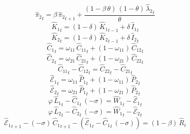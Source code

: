 \begin{dmath}
{{\hat{\pi}_{2}}}_{t}={{\beta}}\, {{\hat{\pi}_{2}}}_{t+1}+\frac{\left(1-{{\beta}}\, {{\theta}}\right)\, \left(1-{{\theta}}\right)\, {{\hat{\lambda}_{2}}}_{t}}{{{\theta}}}
\end{dmath}
\begin{dmath}
{{\hat{K}_{1}}}_{t}=\left(1-{{\delta}}\right)\, {{\hat{K}_{1}}}_{t-1}+{{\delta}}\, {{\hat{I}_{1}}}_{t}
\end{dmath}
\begin{dmath}
{{\hat{K}_{2}}}_{t}=\left(1-{{\delta}}\right)\, {{\hat{K}_{2}}}_{t-1}+{{\delta}}\, {{\hat{I}_{2}}}_{t}
\end{dmath}
\begin{dmath}
{{\hat{C}_{1}}}_{t}={{\omega_{11}}}\, {{\hat{C}_{1 1}}}_{t}+\left(1-{{\omega_{11}}}\right)\, {{\hat{C}_{1 2}}}_{t}
\end{dmath}
\begin{dmath}
{{\hat{C}_{2}}}_{t}={{\omega_{21}}}\, {{\hat{C}_{2 1}}}_{t}+\left(1-{{\omega_{21}}}\right)\, {{\hat{C}_{2 2}}}_{t}
\end{dmath}
\begin{dmath}
{{\hat{C}_{1 1}}}_{t}-{{\hat{C}_{1 2}}}_{t}={{\hat{C}_{2 2}}}_{t}-{{\hat{C}_{2 1}}}_{t}
\end{dmath}
\begin{dmath}
{{\hat{\mathscr{E}}_{1}}}_{t}={{\omega_{11}}}\, {{\hat{P}_{1}}}_{t}+\left(1-{{\omega_{11}}}\right)\, {{\hat{P}_{2}}}_{t}
\end{dmath}
\begin{dmath}
{{\hat{\mathscr{E}}_{2}}}_{t}={{\omega_{21}}}\, {{\hat{P}_{1}}}_{t}+\left(1-{{\omega_{21}}}\right)\, {{\hat{P}_{2}}}_{t}
\end{dmath}
\begin{dmath}
{{\varphi}}\, {{\hat{L}_{1}}}_{t}-{{\hat{C}_{1}}}_{t}\, \left(-{{\sigma}}\right)={{\hat{W}_{1}}}_{t}-{{\hat{\mathscr{E}}_{1}}}_{t}
\end{dmath}
\begin{dmath}
{{\varphi}}\, {{\hat{L}_{2}}}_{t}-{{\hat{C}_{2}}}_{t}\, \left(-{{\sigma}}\right)={{\hat{W}_{1}}}_{t}-{{\hat{\mathscr{E}}_{2}}}_{t}
\end{dmath}
\begin{dmath}
{{\hat{\mathscr{E}}_{1}}}_{t+1}-\left(-{{\sigma}}\right)\, {{\hat{C}_{1}}}_{t+1}-\left({{\hat{\mathscr{E}}_{1}}}_{t}-{{\hat{C}_{1}}}_{t}\, \left(-{{\sigma}}\right)\right)=\left(1-{{\beta}}\right)\, {{\hat{R}}}_{t}
\end{dmath}

